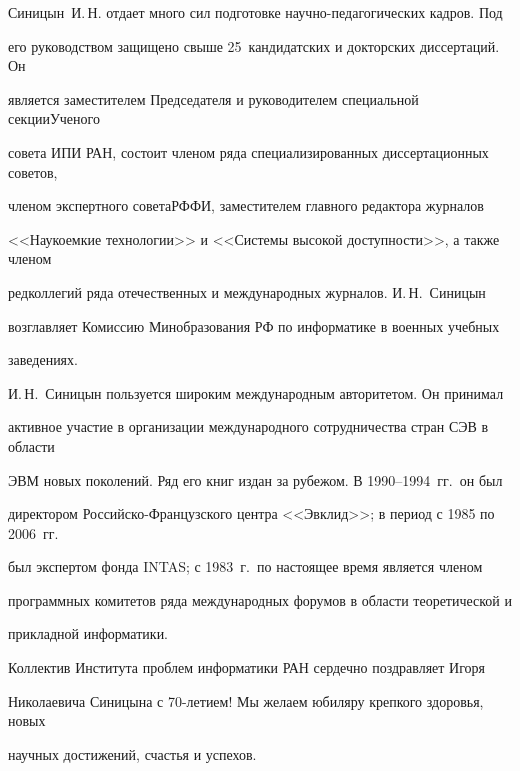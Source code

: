      

     Синицын~И.\,Н. отдает много сил подготовке научно-пе\-да\-го\-ги\-че\-ских кадров. Под 

его руководством защищено свыше 25~кандидатских и докторских диссертаций. Он 

является заместителем Председателя и руководителем специальной секции\linebreak Ученого 

совета ИПИ РАН, состоит членом ряда специализированных диссертационных советов, 

членом экспертного совета\linebreak РФФИ, заместителем главного редактора журналов 

<<Наукоемкие технологии>> и <<Системы высокой доступности>>, а также членом 

редколлегий ряда отечественных и международных журналов. И.\,Н.~Синицын 

возглавляет Комиссию Минобразования РФ по информатике в военных учебных 

заведениях.

     

     И.\,Н.~Синицын пользуется широким международным авторитетом. Он принимал 

активное участие в организации международного сотрудничества стран СЭВ в области 

ЭВМ новых поколений. Ряд его книг издан за рубежом. В 1990--1994~гг.\ он был 

директором Российско-Французского центра <<Эвклид>>; в период с 1985 по 2006~гг.\ 

был экспертом фонда INTAS; с 1983~г.\ по настоящее время является членом 

программных комитетов ряда международных форумов в области теоретической и 

прикладной информатики.

     

     \bigskip

     Коллектив Института проблем информатики РАН сердечно поздравляет Игоря 

Николаевича Синицына с 70-летием! Мы желаем юбиляру крепкого здоровья, новых 

научных достижений, счастья и успехов.


